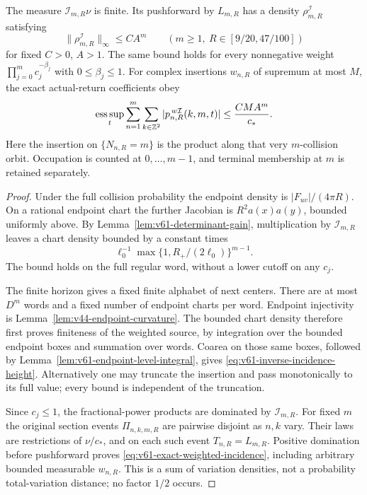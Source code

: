 \begin{theorem}
\label{thm:v61-inverse-incidence-density}
The measure $\mathcal I_{m,R}\nu$ is finite. Its pushforward by
$L_{m,R}$ has a density $\rho^{\mathcal I}_{m,R}$ satisfying
\begin{equation}\label{eq:v61-inverse-incidence-height}
 \|\rho^{\mathcal I}_{m,R}\|_\infty\le CA^m
       \qquad(m\ge1,\ R\in[9/20,47/100])
\end{equation}
for fixed $C>0$, $A>1$. The same bound holds for every nonnegative
weight $\prod_{j=0}^m c_j^{-\beta_j}$ with $0\le\beta_j\le1$.
For complex insertions $w_{n,R}$ of supremum at most $M$, the exact
actual-return coefficients obey
\begin{equation}\label{eq:v61-exact-weighted-incidence}
 \operatorname*{ess\,sup}_t
 \sum_{n=1}^{m}\sum_{k\in\Z^2}
 |p^{\,w\mathcal I}_{n,R}(k,m,t)|\le\frac{CM A^m}{c_*}.
\end{equation}
Here the insertion on $\{N_{n,R}=m\}$ is the product along that
very $m$-collision orbit. Occupation is counted at $0,\ldots,m-1$,
and terminal membership at $m$ is retained separately.
\end{theorem}
\begin{proof}
Under the full collision probability the endpoint density is
$|F_{uv}|/(4\pi R)$. On a rational endpoint chart the further
Jacobian is $R^2a(x)a(y)$, bounded uniformly above. By
Lemma~\ref{lem:v61-determinant-gain}, multiplication by
$\mathcal I_{m,R}$ leaves a chart density bounded by a constant
times
\[
 \ell_0^{-1}\max\{1,R_+/(2\ell_0)\}^{m-1}.
\]
The bound holds on the full regular word, without a lower cutoff
on any $c_j$.

The finite horizon gives a fixed finite alphabet of next centers.
There are at most $D^m$ words and a fixed number of endpoint charts
per word. Endpoint injectivity is
Lemma~\ref{lem:v44-endpoint-curvature}. The bounded chart density
therefore first proves finiteness of the weighted source, by integration
over the bounded endpoint boxes and summation over words. Coarea on
those same boxes, followed by Lemma~\ref{lem:v61-endpoint-level-integral},
gives \eqref{eq:v61-inverse-incidence-height}. Alternatively one may
truncate the insertion and pass monotonically to its full value; every
bound is independent of the truncation.

Since $c_j\le1$, the fractional-power products are dominated by
$\mathcal I_{m,R}$. For fixed $m$ the original section events
$\Pi_{n,k,m,R}$ are pairwise disjoint as $n,k$ vary. Their laws
are restrictions of $\nu/c_*$, and on each such event $T_{n,R}=L_{m,R}$.
Positive domination before pushforward proves
\eqref{eq:v61-exact-weighted-incidence}, including arbitrary bounded
measurable $w_{n,R}$. This is a sum of variation densities, not a
probability total-variation distance; no factor $1/2$ occurs.
\end{proof}

